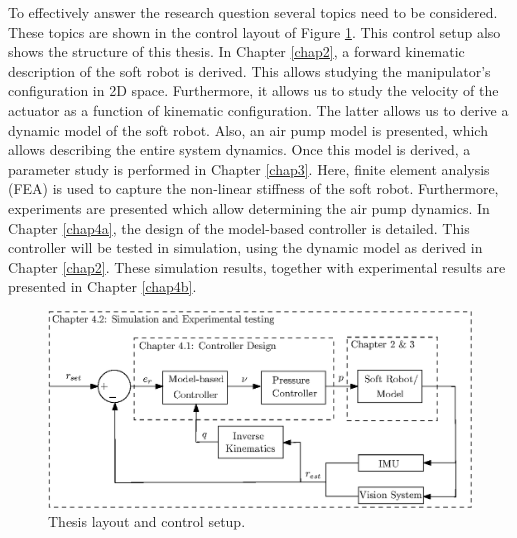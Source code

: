 To effectively answer the research question several topics need to be considered. These topics are shown in the control layout of Figure \ref{fig1:controlarchitecture}. This control setup also shows the structure of this thesis. In Chapter \ref{chap2}, a forward kinematic description of the soft robot is derived. This allows studying the manipulator's configuration in 2D space. Furthermore, it allows us to study the velocity of the actuator as a function of kinematic configuration. The latter allows us to derive a dynamic model of the soft robot. Also, an air pump model is presented, which allows describing the entire system dynamics. Once this model is derived, a parameter study is performed in Chapter \ref{chap3}. Here, finite element analysis (FEA) is used to capture the non-linear stiffness of the soft robot. Furthermore, experiments are presented which allow determining the air pump dynamics. In Chapter \ref{chap4a}, the design of the model-based controller is detailed. This controller will be tested in simulation, using the dynamic model as derived in Chapter \ref{chap2}. These simulation results, together with experimental results are presented in Chapter \ref{chap4b}.




\begin{figure}[H]
    \centering
    \includegraphics[width = \textwidth]{Figures/Chapter1/controlschemeintroduct.eps}
    \caption{Thesis layout and control setup.}
    \label{fig1:controlarchitecture}
\end{figure}

